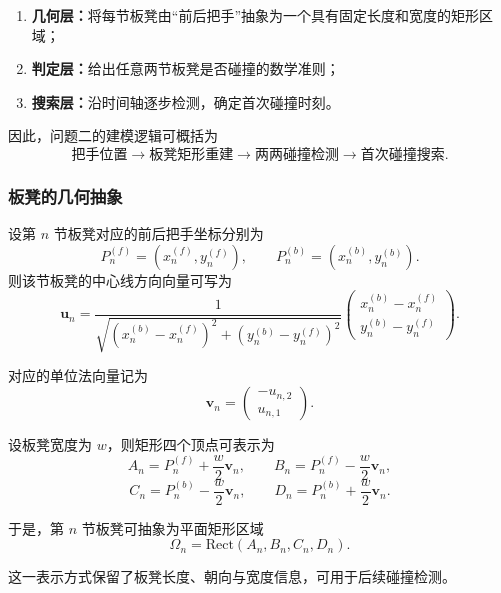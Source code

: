 \documentclass[12pt,a4paper]{ctexart}
\begin{document}
\begin{enumerate}
    \item \textbf{几何层：}将每节板凳由“前后把手”抽象为一个具有固定长度和宽度的矩形区域；
    \item \textbf{判定层：}给出任意两节板凳是否碰撞的数学准则；
    \item \textbf{搜索层：}沿时间轴逐步检测，确定首次碰撞时刻。
\end{enumerate}

因此，问题二的建模逻辑可概括为
\[
\text{把手位置} \longrightarrow \text{板凳矩形重建} \longrightarrow \text{两两碰撞检测} \longrightarrow \text{首次碰撞搜索}.
\]

\subsubsection{板凳的几何抽象}
设第 $n$ 节板凳对应的前后把手坐标分别为
\[
P_n^{(f)}=(x_n^{(f)},y_n^{(f)}), \qquad
P_n^{(b)}=(x_n^{(b)},y_n^{(b)}).
\]
则该节板凳的中心线方向向量可写为
\begin{equation}
\bm{u}_n=
\frac{1}{\sqrt{\left(x_n^{(b)}-x_n^{(f)}\right)^2+\left(y_n^{(b)}-y_n^{(f)}\right)^2}}
\begin{pmatrix}
x_n^{(b)}-x_n^{(f)}\\
y_n^{(b)}-y_n^{(f)}
\end{pmatrix}.
\end{equation}

对应的单位法向量记为
\begin{equation}
\bm{v}_n=
\begin{pmatrix}
-u_{n,2}\\
u_{n,1}
\end{pmatrix}.
\end{equation}

设板凳宽度为 $w$，则矩形四个顶点可表示为
\begin{equation}
A_n=P_n^{(f)}+\frac{w}{2}\bm{v}_n,
\qquad
B_n=P_n^{(f)}-\frac{w}{2}\bm{v}_n,
\end{equation}
\begin{equation}
C_n=P_n^{(b)}-\frac{w}{2}\bm{v}_n,
\qquad
D_n=P_n^{(b)}+\frac{w}{2}\bm{v}_n.
\end{equation}

于是，第 $n$ 节板凳可抽象为平面矩形区域
\begin{equation}
\Omega_n=\text{Rect}(A_n,B_n,C_n,D_n).
\end{equation}

这一表示方式保留了板凳长度、朝向与宽度信息，可用于后续碰撞检测。
\end{document}
